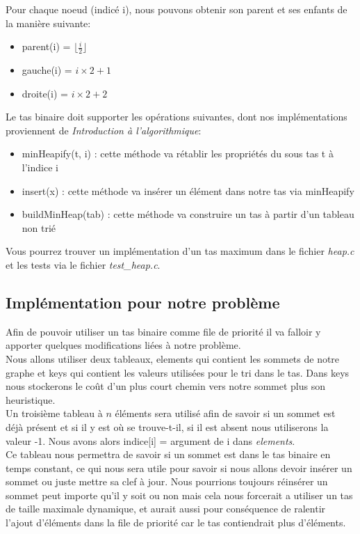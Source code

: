 \documentclass{article}
\begin{document}
Pour chaque noeud (indicé i), nous pouvons obtenir son parent et ses enfants
de la manière suivante:\\
\begin{itemize}
	\item parent(i)  = $\lfloor \frac{i}{2}  \rfloor$
	\item gauche(i) = $i \times 2 + 1$
	\item droite(i) = $i \times 2 + 2 $\\ 
\end{itemize}

Le tas binaire doit supporter les opérations suivantes, dont nos implémentations proviennent de 
\textit{Introduction à l'algorithmique}:
\begin{itemize}
	\item minHeapify(t, i) : cette méthode va rétablir les propriétés du sous tas t à l'indice i
	\item insert(x) : cette méthode va insérer un élément dans notre tas via minHeapify
	\item buildMinHeap(tab) : cette méthode va construire un tas à partir d'un tableau non trié\\
\end{itemize}

Vous pourrez trouver un implémentation d'un tas maximum dans le fichier \textit{heap.c} et 
les tests via le fichier \textit{test\_heap.c}.

\subsection{Implémentation pour notre problème}

Afin de pouvoir utiliser un tas binaire comme file de priorité il va falloir y apporter quelques
modifications liées à notre problème.\\

Nous allons utiliser deux tableaux, elements qui contient les sommets de notre graphe
et keys qui contient les valeurs utilisées pour le tri dans le tas. Dans keys nous
stockerons le coût d'un plus court chemin vers notre sommet plus son heuristique.\\

Un troisième tableau à $n$ éléments sera utilisé afin de savoir si un sommet est
déjà présent et si il y est où se trouve-t-il, si il est absent nous utiliserons la valeur -1.
Nous avons alors indice[i] = argument de i dans \textit{elements}.\\
Ce tableau nous permettra de savoir si un sommet est dans le tas binaire en temps constant,
ce qui nous sera utile pour savoir si nous allons devoir insérer un sommet ou juste 
mettre sa clef à jour. Nous pourrions toujours réinsérer un sommet peut importe qu'il y soit ou
non mais cela nous forcerait a utiliser un tas de taille maximale dynamique, et aurait aussi
pour conséquence de ralentir l'ajout d'éléments dans la file de priorité car le tas 
contiendrait plus d'éléments.\\
\end{document}

